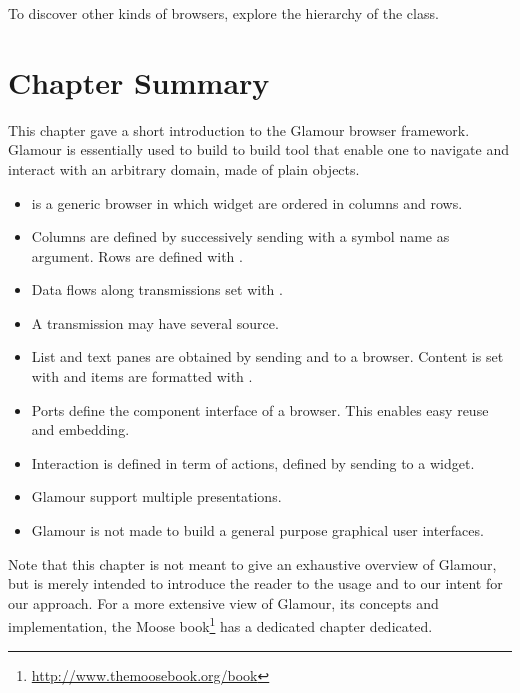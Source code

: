 \documentclass[a4paper,10pt,twoside]{book}
\begin{document}
To discover other kinds of browsers, explore the hierarchy of the
 class.

\section{Chapter Summary}

This chapter gave a short introduction to the Glamour browser framework. Glamour is essentially used to build to build tool that enable one to navigate and interact with an arbitrary domain, made of plain objects.

\begin{itemize}
\item {} is a generic browser in which widget are ordered in columns and rows.
\item Columns are defined by successively sending  with a symbol name as argument. Rows are defined with .
\item Data flows along transmissions set with .
\item A transmission may have several source.
\item List and text panes are obtained by sending  and  to a browser. Content is set with  and items are formatted with .
\item Ports define the component interface of a browser. This enables easy reuse and embedding.
\item Interaction is defined in term of actions, defined by sending  to a widget.
\item Glamour support multiple presentations. 
\item Glamour is not made to build a general purpose graphical user interfaces. 
\end{itemize}

Note that this chapter 
is not meant to give an exhaustive overview of Glamour, but is merely
intended to introduce the reader to the usage and to our intent for
our approach. For a more extensive view of Glamour, its concepts and
implementation, the Moose
book\footnote{\url{http://www.themoosebook.org/book}} has a dedicated
chapter dedicated.

\ifx\wholebook\relax\else
   
   
\end{document}
